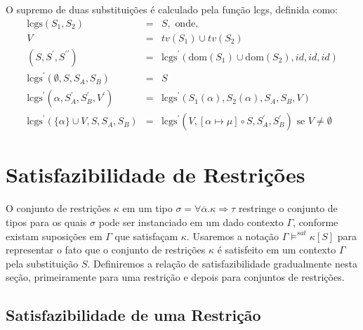 O supremo de duas substitui\c{c}\~oes \'e calculado pela fun\c{c}\~ao lcgs, definida como:
\begin{equation*}
	\begin{array}{rcl}
		\text{lcgs}(S_{1},S_{2}) & = & S, \text{ onde},\\
		V                        & = & tv(S_{1})\cup tv(S_{2})\\
		(S, S^{\prime},S^{\prime\prime}) & = & \text{lcgs}^{\prime}(\text{dom}(S_{1})\cup\text{dom}(S_{2}),id,id,id)\\
		\text{lcgs}^{\prime}(\emptyset,S,S_{A},S_{B}) & = & S\\
		\text{lcgs}^{\prime}(\alpha,S^{\prime}_{A},S^{\prime}_{B}, V^{\prime}) & = & 
		    \text{lcgs}^{\prime}(S_{1}(\alpha),S_{2}(\alpha),S_{A},S_{B},V)\\
		\text{lcgs}^{\prime}(\{\alpha\}\cup V,S,S_{A},S_{B}) & = &
		    \text{lcgs}^{\prime}(V,[\alpha\mapsto\mu]\circ S, S^{\prime}_{A}, S^{\prime}_{B})\text{ se } V\neq\emptyset
	\end{array}
\end{equation*}

\section{Satisfazibilidade de Restri\c{c}\~oes}\label{sat}

O conjunto de restri\c{c}\~oes $\kappa$ em um tipo $\sigma=\forall\overline{\alpha}.\kappa\Rightarrow\tau$ restringe 
o conjunto de tipos para os quais $\sigma$ pode ser instanciado em um dado contexto $\Gamma$, conforme existam 
suposi\c{c}\~oes em $\Gamma$ que satisfa\c{c}am $\kappa$. Usaremos a nota\c{c}\~ao 
$\Gamma\models^{sat}\kappa[S]$ para representar o fato que o conjunto de restri\c{c}\~oes $\kappa$ \'e satisfeito em 
um contexto $\Gamma$ pela substitui\c{c}\~ao $S$. Definiremos a rela\c{c}\~ao de satisfazibilidade 
gradualmente nesta se\c{c}\~ao, primeiramente para uma restri\c{c}\~ao e depois para conjuntos de restri\c{c}\~oes.

\subsection{Satisfazibilidade de uma Restri\c{c}\~ao}\label{satone}

